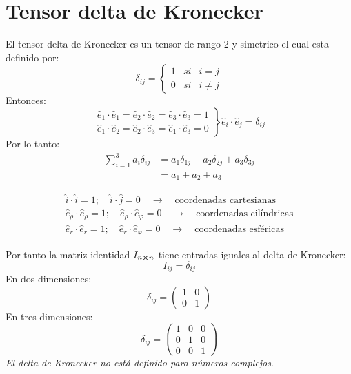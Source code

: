 \documentclass[../main]{subfiles}
\begin{document}
\section{Tensor delta de Kronecker}
El tensor delta de Kronecker es un tensor de rango 2 y simetrico el cual esta definido por:
\begin{equation}
    \delta_{ij}=
    \left\{ 
    \begin{array}{lll}
         1 & si & i=j \\
         0 & si & i\neq j 
    \end{array} 
    \right. 
\end{equation}
Entonces:
\begin{equation}
    \left.
    \begin{array}{l}
         \hat{e}_1 \cdot \hat{e}_1=\hat{e}_2 \cdot \hat{e}_2=\hat{e}_3 \cdot \hat{e}_3=1 \\  
         \hat{e}_1 \cdot \hat{e}_2=\hat{e}_2 \cdot \hat{e}_3=\hat{e}_1 \cdot \hat{e}_3=0 
    \end{array} 
    \right \} 
    \hat{e}_i \cdot \hat{e}_j=\delta_{ij}  
\end{equation}
Por lo tanto:
\begin{align}
    \sum_{i=1}^3 a_i \delta_{ij}&=a_1 \delta_{1j}+a_2 \delta_{2j}+a_3 \delta_{3j} \nonumber\\
    &=a_1+a_2+a_3
\end{align}
\begin{nota}{}
\vspace{-0.5cm}
    \begin{align*}
        \hat{i} \cdot \hat{i}=1  ; \quad \hat{i} \cdot \hat{j}=0 \quad \rightarrow \quad \text{coordenadas cartesianas} \\
        \hat{e}_{\rho} \cdot \hat{e}_{\rho}=1  ; \quad \hat{e}_{\rho} \cdot \hat{e}_{\varphi}=0 \quad \rightarrow \quad \text{coordenadas cilíndricas} \\
        \hat{e}_{r}\cdot \hat{e}_r=1 ; \quad \hat{e}_r \cdot \hat{e}_{\varphi}=0 \quad \rightarrow \quad \text{coordenadas esféricas} 
    \end{align*}
\end{nota}
Por tanto la matriz identidad $I_{n \cross n}$ tiene entradas iguales al delta de Kronecker:
\begin{equation}
    I_{ij}=\delta_{ij}
\end{equation}
En dos dimensiones:
\begin{equation}
    \delta_{ij}=
    \left (
      \begin{array}{ll}
        1 & 0  \\
        0 & 1 
      \end{array}
    \right )
\end{equation}
En tres dimensiones:
\begin{equation}
    \delta_{ij}=
    \left (
      \begin{array}{lll}
        1 & 0 & 0 \\
        0 & 1 & 0 \\
        0 & 0 & 1
      \end{array}
    \right )
\end{equation}
\textit{El delta de Kronecker no está definido para números complejos}.
\end{document}
